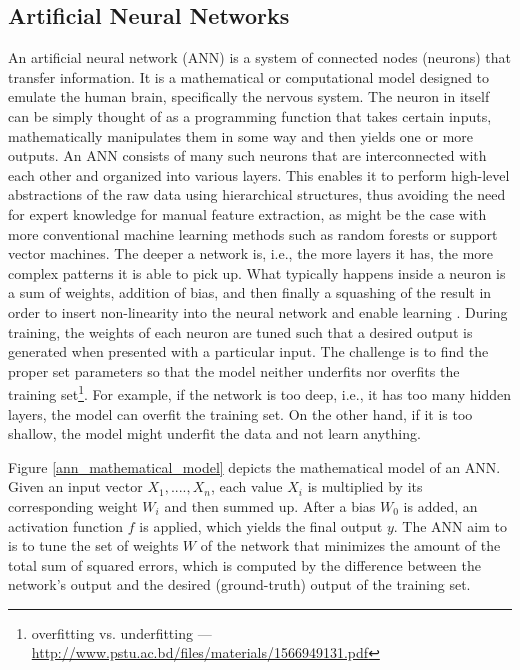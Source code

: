\documentclass[extern,palatino]{cgMA}
\begin{document}
\subsection{Artificial Neural Networks}
\label{artificial_neural_networks_background}

An artificial neural network (ANN) is a system of connected nodes (neurons) that transfer information. It is a mathematical or computational model designed to emulate the human brain, specifically the nervous system. The neuron in itself can be simply thought of as a programming function that takes certain inputs, mathematically manipulates them in some way and then yields one or more outputs. An ANN consists of many such neurons that are interconnected with each other and organized into various layers. This enables it to perform high-level abstractions of the raw data using hierarchical structures, thus avoiding the need for expert knowledge for manual feature extraction, as might be the case with more conventional machine learning methods such as random forests or support vector machines. The deeper a network is, i.e., the more layers it has, the more complex patterns it is able to pick up. What typically happens inside a neuron is a sum of weights, addition of bias, and then finally a squashing of the result in order to insert non-linearity into the neural network and enable learning \cite{nielsen2015neural}. During training, the weights of each neuron are tuned such that a desired output is generated when presented with a particular input. The challenge is to find the proper set parameters so that the model neither underfits nor overfits the training set\footnote{overfitting vs. underfitting --- \url{http://www.pstu.ac.bd/files/materials/1566949131.pdf}}. For example, if the network is too deep, i.e., it has too many hidden layers, the model can overfit the training set. On the other hand, if it is too shallow, the model might underfit the data and not learn anything. 

Figure \ref{ann_mathematical_model} depicts the mathematical model of an ANN. Given an input vector $X_1, ...., X_n$, each value $X_i$ is multiplied by its corresponding weight $W_i$ and then summed up. After a bias $W_0$ is added, an activation function $f$ is applied, which yields the final output $y$. The ANN aim to is to tune the set of weights $W$ of the network that minimizes the amount of the total sum of squared errors, which is computed by the difference between the network's output and the desired (ground-truth) output of the training set. 
\end{document}
